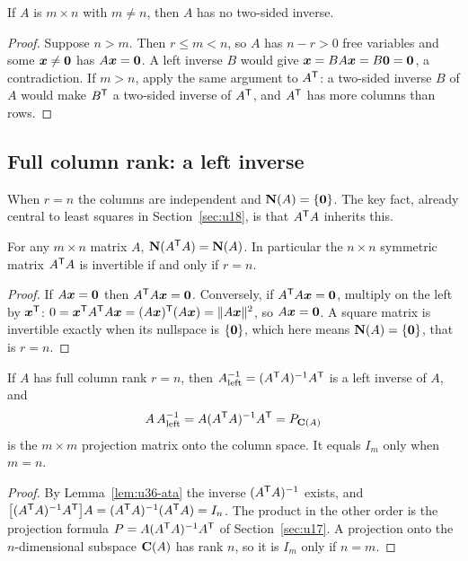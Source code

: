 \begin{proposition}\label{prop:u36-no-two-sided}
If $A$ is $m\times n$ with $m\neq n$, then $A$ has no two-sided inverse.
\end{proposition}
\begin{proof}
Suppose $n>m$. Then $r\le m<n$, so $A$ has $n-r>0$ free variables and some $\boldsymbol{x}\neq\boldsymbol{0}$ has $A\boldsymbol{x}=\boldsymbol{0}$. A left inverse $B$ would give $\boldsymbol{x}=BA\boldsymbol{x}=B\boldsymbol{0}=\boldsymbol{0}$, a contradiction. If $m>n$, apply the same argument to $A^{\mathsf{T}}$: a two-sided inverse $B$ of $A$ would make $B^{\mathsf{T}}$ a two-sided inverse of $A^{\mathsf{T}}$, and $A^{\mathsf{T}}$ has more columns than rows.
\end{proof}

\subsection{Full column rank: a left inverse}

When $r=n$ the columns are independent and $\mathbf{N}(A)=\{\boldsymbol{0}\}$. The key fact, already central to least squares in Section~\ref{sec:u18}, is that $A^{\mathsf{T}} A$ inherits this.

\begin{lemma}\label{lem:u36-ata}
For any $m\times n$ matrix $A$, $\mathbf{N}(A^{\mathsf{T}} A)=\mathbf{N}(A)$. In particular the $n\times n$ symmetric matrix $A^{\mathsf{T}} A$ is invertible if and only if $r=n$.
\end{lemma}
\begin{proof}
If $A\boldsymbol{x}=\boldsymbol{0}$ then $A^{\mathsf{T}} A\boldsymbol{x}=\boldsymbol{0}$. Conversely, if $A^{\mathsf{T}} A\boldsymbol{x}=\boldsymbol{0}$, multiply on the left by $\boldsymbol{x}^{\mathsf{T}}$: $0=\boldsymbol{x}^{\mathsf{T}} A^{\mathsf{T}} A\boldsymbol{x}=(A\boldsymbol{x})^{\mathsf{T}}(A\boldsymbol{x})=\|A\boldsymbol{x}\|^{2}$, so $A\boldsymbol{x}=\boldsymbol{0}$. A square matrix is invertible exactly when its nullspace is $\{\boldsymbol{0}\}$, which here means $\mathbf{N}(A)=\{\boldsymbol{0}\}$, that is $r=n$.
\end{proof}

\begin{theorem}\label{thm:u36-left}
If $A$ has full column rank $r=n$, then $A^{-1}_{\text{left}}=(A^{\mathsf{T}} A)^{-1}A^{\mathsf{T}}$ is a left inverse of $A$, and
\[
A\,A^{-1}_{\text{left}}=A(A^{\mathsf{T}} A)^{-1}A^{\mathsf{T}}=P_{\mathbf{C}(A)}
\]
is the $m\times m$ projection matrix onto the column space. It equals $I_m$ only when $m=n$.
\end{theorem}
\begin{proof}
By Lemma~\ref{lem:u36-ata} the inverse $(A^{\mathsf{T}} A)^{-1}$ exists, and $\bigl[(A^{\mathsf{T}} A)^{-1}A^{\mathsf{T}}\bigr]A=(A^{\mathsf{T}} A)^{-1}(A^{\mathsf{T}} A)=I_n$. The product in the other order is the projection formula $P=A(A^{\mathsf{T}} A)^{-1}A^{\mathsf{T}}$ of Section~\ref{sec:u17}. A projection onto the $n$-dimensional subspace $\mathbf{C}(A)$ has rank $n$, so it is $I_m$ only if $n=m$.
\end{proof}

